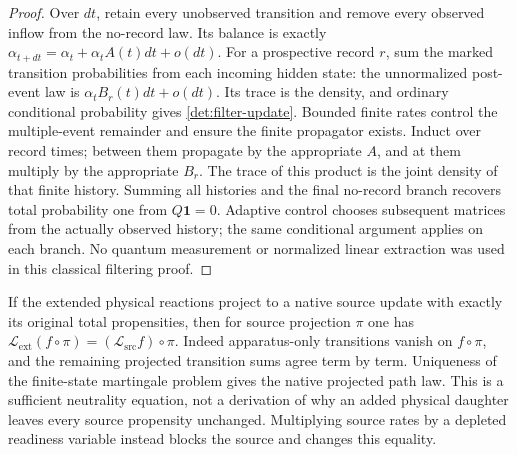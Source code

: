 \documentclass[11pt,oneside,openany]{book}
\theoremstyle{definition}
\theoremstyle{remark}\newtheorem{remark}[theorem]{Remark}
\begin{document}
\begin{proof}
Over $dt$, retain every unobserved transition and remove every observed
inflow from the no-record law. Its balance is exactly
$\alpha_{t+dt}=\alpha_t+\alpha_tA(t)dt+o(dt)$.
For a prospective record $r$, sum the marked transition probabilities
from each incoming hidden state: the unnormalized post-event law is
$\alpha_tB_r(t)dt+o(dt)$. Its trace is the density, and ordinary
conditional probability gives \eqref{det:filter-update}. Bounded
finite rates control the multiple-event remainder and ensure the
finite propagator exists. Induct over record times; between them
propagate by the appropriate $A$, and at them multiply by the
appropriate $B_r$. The trace of this product is the joint density of
that finite history. Summing all histories and the final no-record
branch recovers total probability one from $Q\mathbf1=0$.
Adaptive control chooses subsequent matrices from the actually
observed history; the same conditional argument applies on each
branch. No quantum measurement or normalized linear extraction was
used in this classical filtering proof.
\end{proof}

If the extended physical reactions project to a native source update
with exactly its original total propensities, then for source projection
$\pi$ one has
$\mathcal L_{\mathrm{ext}}(f\circ\pi)
=(\mathcal L_{\mathrm{src}}f)\circ\pi$.
Indeed apparatus-only transitions vanish on $f\circ\pi$, and the
remaining projected transition sums agree term by term. Uniqueness
of the finite-state martingale problem gives the native projected
path law. This is a sufficient neutrality equation, not a derivation
of why an added physical daughter leaves every source propensity
unchanged. Multiplying source rates by a depleted readiness variable
instead blocks the source and changes this equality.
\end{document}
